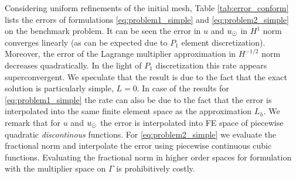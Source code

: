 Considering uniform refinements of the initial mesh, Table \ref{tab:error_conform}
lists the errors of formulations \eqref{eq:problem1_simple} and \eqref{eq:problem2_simple}
on the benchmark problem. It can be seen the error in $u$ and $u_{\odot}$ in $H^1$ norm
converges linearly (as can be expected due to $P_1$ element discretization).
Moreover, the error of the Lagrange multiplier approximation in $H^{-1/2}$ norm
decreases quadratically. In the light of $P_1$ discretization this rate appears
superconvergent. We speculate that the result is due to the fact that the
exact solution is particularly simple, $L=0$. In case of the results for
\eqref{eq:problem1_simple} the rate can also be due to the fact that the
error is interpolated into the same finite element space as the approximation $L_h$.
We remark that for $u$ and $u_{\odot}$ the error is interpolated into FE space of piecewise
quadratic \emph{discontinous} functions. For \eqref{eq:problem2_simple} we
evaluate the fractional norm and interpolate the error using piecewise continuous
cubic functions. Evaluating the fractional norm in higher order spaces
for formulation with the multiplier space on $\Gamma$ is prohibitively costly. 

